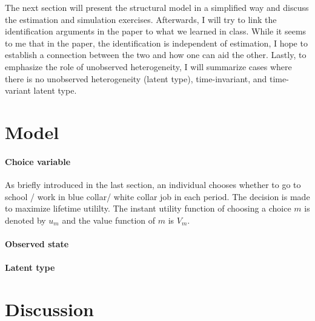 \documentclass[10pt]{article}
\begin{document}
The next section will present the structural model in a simplified way and discuss the estimation and simulation exercises. Afterwards, I will try to link the identification arguments in the paper to what we learned in class. While it seems to me that in the paper, the identification is independent of estimation, I hope to establish a connection between the two and how one can aid the other. Lastly, to emphasize the role of unobserved heterogeneity, I will summarize cases where there is no unobserved heterogeneity (latent type), time-invariant, and time-variant latent type.

\section{Model}

\paragraph{Choice variable} As briefly introduced in the last section, an individual chooses whether to go to school / work in blue collar/ white collar job in each period. The decision is made to maximize lifetime utililty. 
The instant utility function of choosing a choice $m$ is denoted by $u_m$ and the value function of $m$ is $V_m$.  
\paragraph{Observed state}
\paragraph{Latent type}
\section{Discussion}

\pagebreak \newpage 
\end{document}
